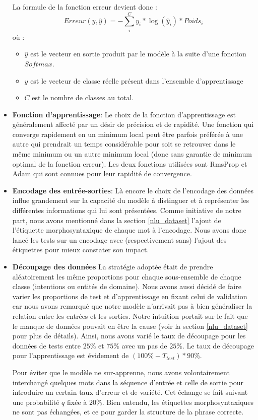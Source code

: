\begin{itemize}
		La formule de la fonction erreur devient donc : 
		\begin{equation*}
			Erreur(y,\hat{y}) = - \sum_{i}^{C} y_i * \log(\hat{y}_i) * Poids_i 
		\end{equation*}
		où : 
		\begin{itemize}
			\item $\hat{y}$ est le vecteur en sortie produit par le modèle à la suite d'une fonction $Softmax$.
			\item $y$ est le vecteur de classe réelle présent dans l'ensemble d'apprentissage
			\item $C$ est le nombre de classes au total.
		\end{itemize}
	
		\item \textbf{Fonction d'apprentissage}:
		Le choix de la fonction d'apprentissage est généralement affecté par un désir de précision et de rapidité. Une fonction qui converge rapidement en un minimum local peut être parfois préférée à une autre qui prendrait un temps considérable pour soit se retrouver dans le même minimum ou un autre minimum local (donc sans garantie de minimum optimal de la fonction erreur). Les deux fonctions utilisées sont RmsProp et Adam qui sont connues pour leur rapidité de convergence.
		
		\item \textbf{Encodage des entrée-sorties}:
		Là encore le choix de l'encodage des données influe grandement sur la capacité du modèle à distinguer et à représenter les différentes informations qui lui sont présentées. Comme initiative de notre part, nous avons mentionné dans la section \ref{nlu_dataset} l'ajout de l'étiquette morphosyntaxique de chaque mot à l'encodage. Nous avons donc lancé les tests sur un encodage avec (respectivement sans) l'ajout des étiquettes pour mieux constater son impact.
		
		\item \textbf{Découpage des données}
		La stratégie adoptée était de prendre aléatoirement les même proportions pour chaque sous-ensemble de chaque classe (intentions ou entités de domaine). Nous avons aussi décidé de faire varier les proportions de test et d'apprentissage en fixant celui de validation car nous avons remarqué que notre modèle n'arrivait pas à bien généraliser la relation entre les entrées et les sorties. Notre intuition portait sur le fait que le manque de données pouvait en être la cause (voir la section \ref{nlu_dataset} pour plus de détails). Ainsi, nous avons varié le taux de découpage pour les données de tests entre $25\%$ et $75\%$ avec un pas de $25\%$. Le taux de découpage pour l'apprentissage est évidement de $(100\%-T_{test})*90\%$.
		\par
		Pour éviter que le modèle ne sur-apprenne, nous avons volontairement interchangé quelques mots dans la séquence d'entrée et celle de sortie pour introduire un certain taux d'erreur et de variété. Cet échange se fait suivant une probabilité $q$ fixée à $20\%$. Bien entendu, les étiquettes morphosyntaxiques ne sont pas échangées, et ce pour garder la structure de la phrase correcte.
	\end{itemize}
